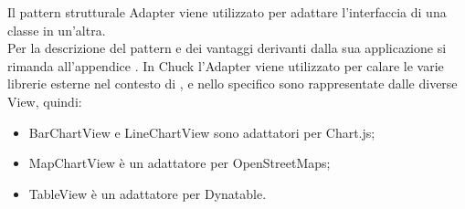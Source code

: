 	Il pattern strutturale Adapter viene utilizzato per adattare l'interfaccia di una classe in un'altra.\\
	Per la descrizione del pattern e dei vantaggi derivanti dalla sua applicazione si rimanda all'appendice .
	In Chuck l'Adapter viene utilizzato per calare le varie librerie esterne nel contesto di \projectname{}, e nello specifico sono rappresentate dalle diverse View, quindi:
	\begin{itemize}
	\item BarChartView e LineChartView sono adattatori per Chart.js;
	\item MapChartView è un adattatore per OpenStreetMaps;
	\item TableView è un adattatore per Dynatable.
	\end{itemize}
	
		
		
		
